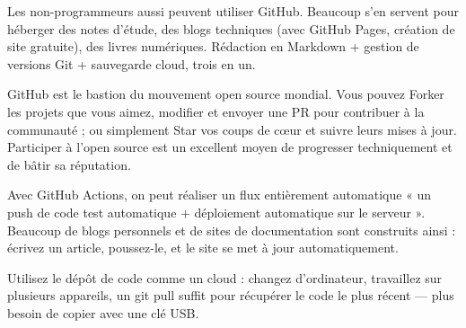 
Les non-programmeurs aussi peuvent utiliser GitHub. Beaucoup s'en servent pour héberger des notes d'étude, des blogs techniques (avec GitHub Pages, création de site gratuite), des livres numériques. Rédaction en Markdown + gestion de versions Git + sauvegarde cloud, trois en un.


GitHub est le bastion du mouvement open source mondial. Vous pouvez Forker les projets que vous aimez, modifier et envoyer une PR pour contribuer à la communauté ; ou simplement Star vos coups de cœur et suivre leurs mises à jour. Participer à l'open source est un excellent moyen de progresser techniquement et de bâtir sa réputation.


Avec GitHub Actions, on peut réaliser un flux entièrement automatique « un push de code test automatique + déploiement automatique sur le serveur ». Beaucoup de blogs personnels et de sites de documentation sont construits ainsi : écrivez un article, poussez-le, et le site se met à jour automatiquement.


Utilisez le dépôt de code comme un cloud : changez d'ordinateur, travaillez sur plusieurs appareils, un git pull suffit pour récupérer le code le plus récent — plus besoin de copier avec une clé USB.


